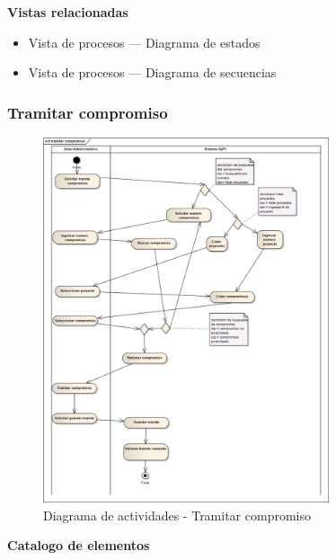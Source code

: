 \documentclass[12pt,oneside,letterpaper]{report}
\begin{document}
\textbf{Vistas relacionadas}
\begin{itemize}
\item Vista de procesos --- Diagrama de estados
\item Vista de procesos --- Diagrama de secuencias
\end{itemize}


\subsubsection{Tramitar compromiso}

\begin{figure}[h!]
  \centering
    \includegraphics[width=0.75\textwidth]{./img/img14.png}
  \caption{Diagrama de actividades - Tramitar compromiso}
\end{figure}

\textbf{Catalogo de elementos}
\end{document}
